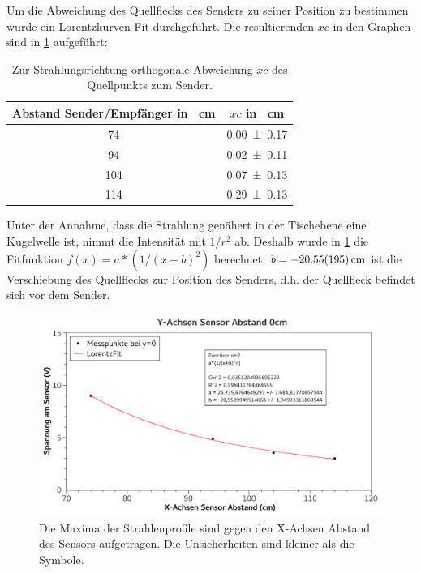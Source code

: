 \documentclass[
	a4paper,
	12pt,
	pagesize,
	ngerman
]{scrartcl}
\begin{document}
	Um die Abweichung des Quellflecks des Senders zu seiner Position zu bestimmen wurde ein Lorentzkurven-Fit durchgeführt. Die resultierenden $xc$ in den Graphen sind in \cref{tab_xc} aufgeführt:
	\begin{table}[H]
		\centering
		\begin{tabular}{ c | c }
			Abstand Sender/Empfänger in \SI{}{cm} & $xc$ in \SI{}{cm}  \\ \hline
			\SI{74}{}&\SI{0,00+-0,17}{}\\
			\SI{94}{}&\SI{0,02+-0,11}{}\\
			\SI{104}{}&\SI{0,07+-0,13}{}\\
			\SI{114}{}&\SI{0,29+-0,13}{}\\
		\end{tabular}
		\caption{Zur Strahlungsrichtung orthogonale Abweichung $xc$ des Quellpunkts zum Sender.}
		\label{tab_xc} 
	\end{table}
	Unter der Annahme, dass die Strahlung genähert in der Tischebene eine Kugelwelle ist, nimmt die Intensität mit $1/r^2$ ab. 
	Deshalb wurde in \cref{fig_y0cm} die Fitfunktion $f(x)=a*(1/(x+b)^2)$ berechnet. $b=\SI{-20,55+-1,95}{cm}$ ist die Verschiebung des Quellflecks zur Position des Senders, d.h. der Quellfleck befindet sich vor dem Sender.
	\begin{figure}[H]
		\includegraphics[width=1\textwidth]{fig_y0cm}
		\centering
		\caption{Die Maxima der Strahlenprofile sind gegen den X-Achsen Abstand des Sensors aufgetragen. Die Unsicherheiten sind kleiner als die Symbole.}
		\label{fig_y0cm}
		\centering
	\end{figure}

	
\end{document}
